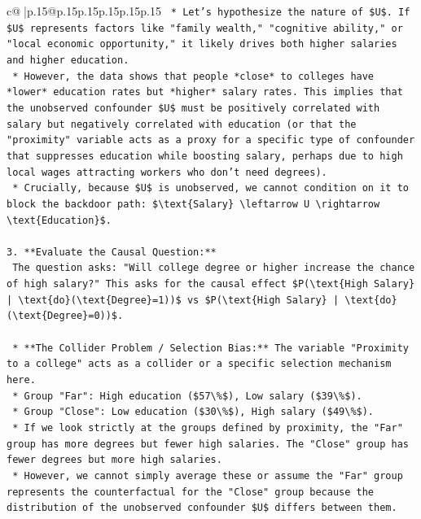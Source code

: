 \documentclass{article}
\begin{document}
{\begin{supertabular}{c@{$\;$}|p{.15\linewidth}@{}p{.15\linewidth}p{.15\linewidth}p{.15\linewidth}p{.15\linewidth}p{.15\linewidth}}
{{{\texttt{    *   Let's hypothesize the nature of \$U\$. If \$U\$ represents factors like "family wealth," "cognitive ability," or "local economic opportunity," it likely drives both higher salaries and higher education.} \\
\texttt{    *   However, the data shows that people *close* to colleges have *lower* education rates but *higher* salary rates. This implies that the unobserved confounder \$U\$ must be positively correlated with salary but negatively correlated with education (or that the "proximity" variable acts as a proxy for a specific type of confounder that suppresses education while boosting salary, perhaps due to high local wages attracting workers who don't need degrees).} \\
\texttt{    *   Crucially, because \$U\$ is unobserved, we cannot condition on it to block the backdoor path: \$\textbackslash{}text\{Salary\} \textbackslash{}leftarrow U \textbackslash{}rightarrow \textbackslash{}text\{Education\}\$.} \\
\\ 
\texttt{3.  **Evaluate the Causal Question:**} \\
\texttt{    The question asks: "Will college degree or higher increase the chance of high salary?" This asks for the causal effect \$P(\textbackslash{}text\{High Salary\} | \textbackslash{}text\{do\}(\textbackslash{}text\{Degree\}=1))\$ vs \$P(\textbackslash{}text\{High Salary\} | \textbackslash{}text\{do\}(\textbackslash{}text\{Degree\}=0))\$.} \\
\\ 
\texttt{    *   **The Collider Problem / Selection Bias:** The variable "Proximity to a college" acts as a collider or a specific selection mechanism here.} \\
\texttt{        *   Group "Far": High education (\$57\textbackslash{}\%\$), Low salary (\$39\textbackslash{}\%\$).} \\
\texttt{        *   Group "Close": Low education (\$30\textbackslash{}\%\$), High salary (\$49\textbackslash{}\%\$).} \\
\texttt{    *   If we look strictly at the groups defined by proximity, the "Far" group has more degrees but fewer high salaries. The "Close" group has fewer degrees but more high salaries.} \\
\texttt{    *   However, we cannot simply average these or assume the "Far" group represents the counterfactual for the "Close" group because the distribution of the unobserved confounder \$U\$ differs between them.} \\
}}}
\end{supertabular}}
\end{document}
